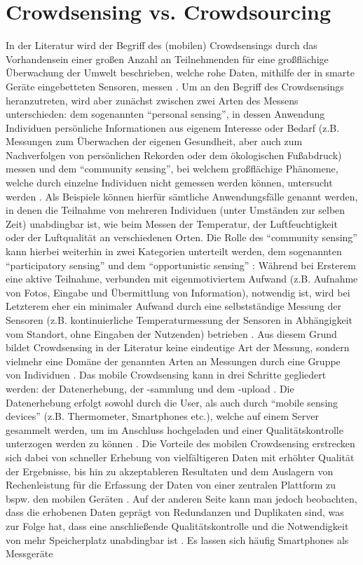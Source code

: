 \section{Crowdsensing vs. Crowdsourcing} %
\label{sec:crowdsensing}
In der Literatur wird der Begriff des (mobilen) Crowdsensings durch das Vorhandensein einer großen Anzahl an Teilnehmenden für eine großflächige Überwachung der Umwelt beschrieben, welche rohe Daten, mithilfe der in smarte Geräte eingebetteten Sensoren, messen \cite{Ray2022}. Um an den Begriff des Crowdsensings heranzutreten, wird aber zunächst zwischen zwei Arten des Messens unterschieden: dem sogenannten \enquote{personal sensing}, in dessen Anwendung Individuen persönliche Informationen aus eigenem Interesse oder Bedarf (z.B. Messungen zum Überwachen der eigenen Gesundheit, aber auch zum Nachverfolgen von persönlichen Rekorden oder dem ökologischen Fußabdruck) messen und dem \enquote{community sensing}, bei welchem großflächige Phänomene, welche durch einzelne Individuen nicht gemessen werden können, untersucht werden \cite{Ganti2011}. Als Beispiele können hierfür sämtliche Anwendungsfälle genannt werden, in denen die Teilnahme von mehreren Individuen (unter Umständen zur selben Zeit) unabdingbar ist, wie beim Messen der Temperatur, der Luftfeuchtigkeit oder der Luftqualität an verschiedenen Orten. Die Rolle des \enquote{community sensing} kann hierbei weiterhin in zwei Kategorien unterteilt werden, dem sogenannten \enquote{participatory sensing} \cite{Burke2006} und dem \enquote{opportunistic sensing} \cite{Lane2010}: \newline Während bei Ersterem eine aktive Teilnahme, verbunden mit eigenmotiviertem Aufwand (z.B. Aufnahme von Fotos, Eingabe und Übermittlung von Information), notwendig ist, wird bei Letzterem eher ein minimaler Aufwand durch eine selbstständige Messung der Sensoren (z.B. kontinuierliche Temperaturmessung der Sensoren in Abhängigkeit vom Standort, ohne Eingaben der Nutzenden) betrieben \cite{Ganti2011}. Aus diesem Grund bildet Crowdsensing in der Literatur keine eindeutige Art der Messung, sondern vielmehr eine Domäne der genannten Arten an Messungen durch eine Gruppe von Individuen \cite{Ganti2011}. \newline Das mobile Crowdsensing kann in drei Schritte gegliedert werden: der Datenerhebung, der -sammlung und dem -upload \cite{Ray2022}. Die Datenerhebung erfolgt sowohl durch die User, als auch durch \enquote{mobile sensing devices} (z.B. Thermometer, Smartphones etc.), welche auf einem Server gesammelt werden, um im Anschluss hochgeladen und einer Qualitätskontrolle unterzogen werden zu können \cite{Ray2022}. Die Vorteile des mobilen Crowdsensing erstrecken sich dabei von schneller Erhebung von vielfältigeren Daten mit erhöhter Qualität der Ergebnisse, bis hin zu akzeptableren Resultaten und dem Auslagern von Rechenleistung für die Erfassung der Daten von einer zentralen Plattform zu bspw. den mobilen Geräten \cite{Ray2022}. Auf der anderen Seite kann man jedoch beobachten, dass die erhobenen Daten geprägt von Redundanzen und Duplikaten sind, was zur Folge hat, dass eine anschließende Qualitätskontrolle und die Notwendigkeit von mehr Speicherplatz unabdingbar ist \cite{Ray2022}. Es lassen sich häufig Smartphones als Messgeräte 